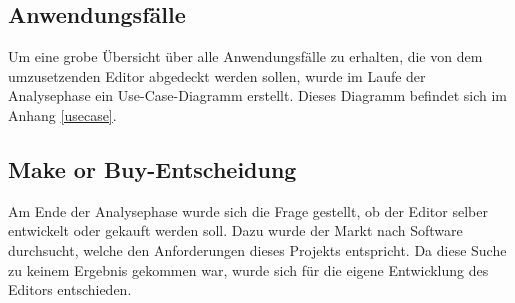 \subsection{Anwendungsfälle}

Um eine grobe Übersicht über alle Anwendungsfälle zu erhalten, die von dem umzusetzenden Editor
abgedeckt werden sollen, wurde im Laufe der Analysephase ein Use-Case-Diagramm erstellt. Dieses
Diagramm befindet sich im Anhang \ref{usecase}.

\subsection{\glqq Make or Buy\grqq -Entscheidung}
Am Ende der Analysephase wurde sich die Frage gestellt, ob der Editor selber entwickelt oder gekauft werden soll. Dazu wurde der Markt nach Software durchsucht, welche den Anforderungen dieses Projekts entspricht. Da diese Suche zu keinem Ergebnis gekommen war, wurde sich für die eigene Entwicklung des Editors entschieden.

\newpage
